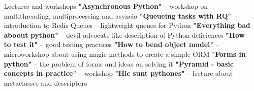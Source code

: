 \begin{rubric}{Lectures and workshops}
\entry*[PyConPL 2015]\textbf{"Asynchronous Python"} -- workshop
    on multithreading, multiprocessing and asyncio
\textbf{"Queueing tasks with RQ"} -- introduction
    to Redis Queues -- lightweight queues for Python
\entry*[PyConPL 2014]\textbf{"Everything bad aboout python"} --
    devil advocate-like description of Python deficiences
\entry*[PyConPL 2013]\textbf{"How to test it"} -- good testing practices
\entry*[4developers 2013]\textbf{"How to bend object model"} -- microworkshop
    about using magic methods to create a simple ORM
\entry*[PyConPL 2012]\textbf{"Forms in python"} -- the problem of forms
    and ideas on solving it
\entry*[PyconPL 2012]\textbf{"Pyramid - basic concepts in practice"} --
    workshop
\entry*[PyConPL 2011]\textbf{"Hic sunt pythones"} -- lecture about metaclasses
    and descriptors
\end{rubric}
